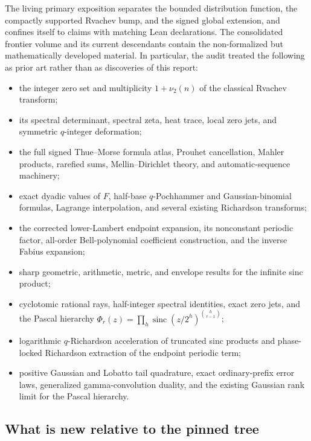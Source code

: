 \documentclass[11pt,oneside]{article}
\numberwithin{equation}{section}
\theoremstyle{definition}
\theoremstyle{remark}
\newcommand{\sinc}{\operatorname{sinc}}
\begin{document}
The living primary exposition separates the bounded distribution function, the compactly
supported Rvachev bump, and the signed global extension, and confines itself to claims with
matching Lean declarations.  The consolidated frontier volume and its current descendants
contain the non-formalized but mathematically developed material.  In particular, the audit
treated the following as prior art rather than as discoveries of this report:
\begin{itemize}
\item the integer zero set and multiplicity $1+\nu_2(n)$ of the classical Rvachev transform;
\item its spectral determinant, spectral zeta, heat trace, local zero jets, and symmetric
      $q$-integer deformation;
\item the full signed Thue--Morse formula atlas, Prouhet cancellation, Mahler products,
      rarefied sums, Mellin--Dirichlet theory, and automatic-sequence machinery;
\item exact dyadic values of $F$, half-base $q$-Pochhammer and Gaussian-binomial formulas,
      Lagrange interpolation, and several existing Richardson transforms;
\item the corrected lower-Lambert endpoint expansion, its nonconstant periodic factor,
      all-order Bell-polynomial coefficient construction, and the inverse Fabius expansion;
\item sharp geometric, arithmetic, metric, and envelope results for the infinite sinc product;
\item cyclotomic rational rays, half-integer spectral identities, exact zero jets, and the
      Pascal hierarchy
      $\Phi_r(z)=\prod_h\sinc(z/2^h)^{\binom h{r-1}}$;
\item logarithmic $q$-Richardson acceleration of truncated sinc products and phase-locked
      Richardson extraction of the endpoint periodic term;
\item positive Gaussian and Lobatto tail quadrature, exact ordinary-prefix error laws,
      generalized gamma-convolution duality, and the existing Gaussian rank limit for the
      Pascal hierarchy.
\end{itemize}

\subsection{What is new relative to the pinned tree}
\end{document}
